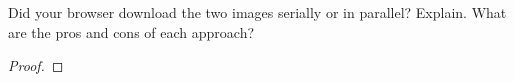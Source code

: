 \documentclass[../../main.tex]{subfiles}
\begin{document}
\begin{wts}
Did your browser download the two images serially or in parallel? Explain. What are the pros and cons of each approach?
\end{wts}
\begin{proof}

\end{proof}
\end{document}
